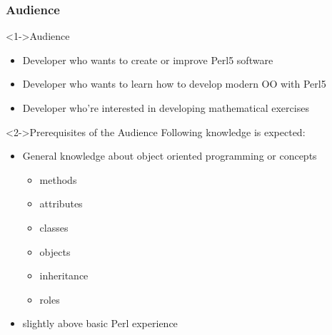 \documentclass[ngerman,xcolor={table,dvipsnames},scriptsizeer,compress,hyperref={bookmarks,colorlinks}]{beamer}
\begin{document}
\begin{frame}[fragile]
\frametitle{Audience}
\begin{block}<1->{Audience}
\begin{itemize}
\item Developer who wants to create or improve Perl5 software
\item Developer who wants to learn how to develop modern OO with Perl5
\item Developer who're interested in developing mathematical exercises
\end{itemize}
\end{block}

\begin{block}<2->{Prerequisites of the Audience}
Following knowledge is expected:
\begin{itemize}
\item General knowledge about object oriented programming or concepts
      \begin{itemize}
      \item methods
      \item attributes
      \item classes
      \item objects
      \item inheritance
      \item roles
      \end{itemize}
\item slightly above basic Perl experience
\end{itemize}
\end{block}
\end{frame}
\end{document}
